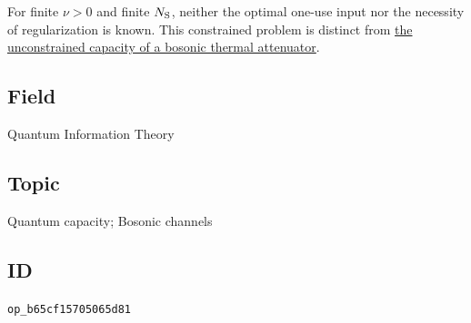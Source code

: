 For finite $\nu>0$ and finite $N_{\rm S}$, neither the optimal one-use input
nor the necessity of regularization is known.  This constrained problem is
distinct from \href{https://qiqc-op.com/problem/op_9209e4eb15586dec/}{the unconstrained capacity of a bosonic thermal attenuator}.

\subsection*{Field}

Quantum Information Theory

\subsection*{Topic}

Quantum capacity; Bosonic channels

\subsection*{ID}

\texttt{op\_b65cf15705065d81}
